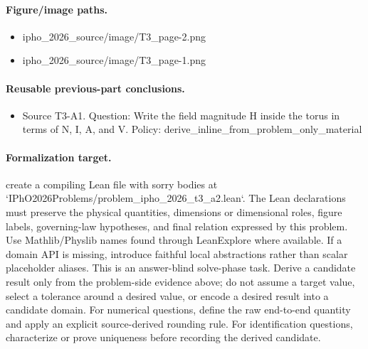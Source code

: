 \paragraph{Figure/image paths.}
\begin{itemize}
\item ipho\_2026\_source/image/T3\_page-2.png
\item ipho\_2026\_source/image/T3\_page-1.png
\end{itemize}

\paragraph{Reusable previous-part conclusions.}
\begin{itemize}
\item Source T3-A1. Question: Write the field magnitude H inside the torus in terms of N, I, A, and V. Policy: derive\_inline\_from\_problem\_only\_material
\end{itemize}

\paragraph{Formalization target.}
create a compiling Lean file with sorry bodies at `IPhO2026Problems/problem\_ipho\_2026\_t3\_a2.lean`.
The Lean declarations must preserve the physical quantities, dimensions or dimensional roles, figure labels, governing-law hypotheses, and final relation expressed by this problem.
Use Mathlib/Physlib names found through LeanExplore where available. If a domain API is missing, introduce faithful local abstractions rather than scalar placeholder aliases.
This is an answer-blind solve-phase task. Derive a candidate result only from the problem-side evidence above; do not assume a target value, select a tolerance around a desired value, or encode a desired result into a candidate domain.
For numerical questions, define the raw end-to-end quantity and apply an explicit source-derived rounding rule. For identification questions, characterize or prove uniqueness before recording the derived candidate.

